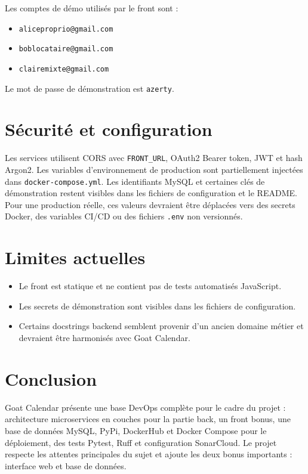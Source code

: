 \documentclass[a4paper,11pt]{article}
\begin{document}
Les comptes de démo utilisés par le front sont :

\begin{itemize}[leftmargin=*]
  \item \texttt{aliceproprio@gmail.com}
  \item \texttt{boblocataire@gmail.com}
  \item \texttt{clairemixte@gmail.com}
\end{itemize}

Le mot de passe de démonstration est \texttt{azerty}.

\section{Sécurité et configuration}

Les services utilisent CORS avec \texttt{FRONT\_URL}, OAuth2 Bearer token, JWT et hash Argon2. Les variables d'environnement de production sont partiellement injectées dans \texttt{docker-compose.yml}. Les identifiants MySQL et certaines clés de démonstration restent visibles dans les fichiers de configuration et le README. Pour une production réelle, ces valeurs devraient être déplacées vers des secrets Docker, des variables CI/CD ou des fichiers \texttt{.env} non versionnés.

\section{Limites actuelles}

\begin{itemize}[leftmargin=*]
  \item Le front est statique et ne contient pas de tests automatisés JavaScript.
  \item Les secrets de démonstration sont visibles dans les fichiers de configuration.
  \item Certains docstrings backend semblent provenir d'un ancien domaine métier et devraient être harmonisés avec Goat Calendar.
\end{itemize}

\section{Conclusion}

Goat Calendar présente une base DevOps complète pour le cadre du projet : architecture microservices en couches pour la partie back, un front bonus, une base  de données MySQL, PyPi, DockerHub et Docker Compose pour le déploiement, des tests Pytest, Ruff et configuration SonarCloud. Le projet respecte les attentes principales du sujet et ajoute les deux bonus importants : interface web et base de données.
\end{document}
